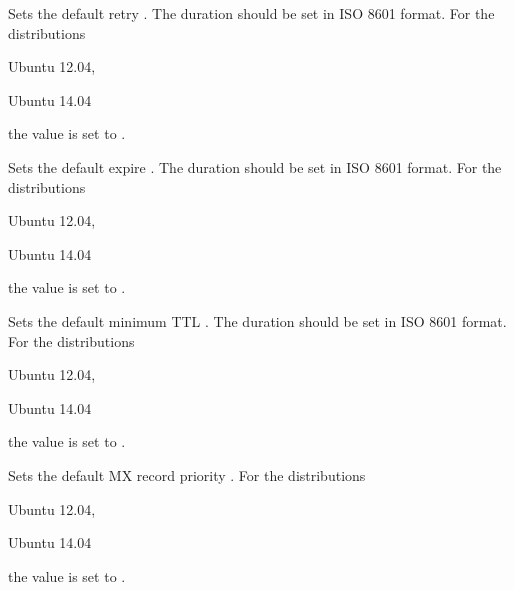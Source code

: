 
Sets the default retry . The duration should be set in 
ISO 8601 format.
For the distributions
\begin{inparaitem}
\item[\TheDistribution{ubuntu}] Ubuntu 12.04,
\item[\TheDistribution{ubuntu}] Ubuntu 14.04
\end{inparaitem}
the value is set to .


Sets the default expire . The duration should be set in 
ISO 8601 format.
For the distributions
\begin{inparaitem}
\item[\TheDistribution{ubuntu}] Ubuntu 12.04,
\item[\TheDistribution{ubuntu}] Ubuntu 14.04
\end{inparaitem}
the value is set to .


Sets the default minimum TTL . The duration should be set in 
ISO 8601 format.
For the distributions
\begin{inparaitem}
\item[\TheDistribution{ubuntu}] Ubuntu 12.04,
\item[\TheDistribution{ubuntu}] Ubuntu 14.04
\end{inparaitem}
the value is set to .


Sets the default MX record priority .
For the distributions
\begin{inparaitem}
\item[\TheDistribution{ubuntu}] Ubuntu 12.04,
\item[\TheDistribution{ubuntu}] Ubuntu 14.04
\end{inparaitem}
the value is set to .
